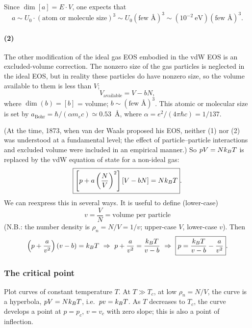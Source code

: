 Since $\dim[a] = E\cdot V$, one expects that
\begin{equation}
  a\sim U_0\cdot(\text{atom or molecule size})^3\sim U_0(\text{few \AA})^3\sim(10^{-2}\ \text{eV})(\text{few \AA})^3 .
\end{equation}

\paragraph{(2)} The other modification of the ideal gas EOS embodied in the vdW EOS is an excluded-volume
correction. The nonzero size of the gas particles is neglected in the ideal EOS, but in reality these particles
do have nonzero size, so the volume available to them is less than $V$;
\begin{equation}
  V_{\text{available}} = V - bN,
\end{equation}
where $\dim(b) = [b]$ = volume; $b\sim(\text{few \AA})^3$. This atomic or molecular size is set by
$a_{\text{Bohr}} = \hbar/(\alpha m_ec)\simeq 0.53$~\AA, where $\alpha = e^2/(4\pi\hbar c) = 1/137$.

(At the time, 1873, when van der Waals proposed his EOS, neither (1) nor (2) was understood at a fundamental
level; the effect of particle--particle interactions and excluded volume were included in an empirical manner.)
So $pV = Nk_{B} T$ is replaced by the vdW equation of state for a non-ideal gas:
\begin{equation}
  \boxed{\left[p + a\left(\frac{N}{V}\right)^2\right]\left[V - bN\right] = Nk_{B} T}.
\end{equation}
We can reexpress this in several ways. It is useful to define (lower-case)
\begin{equation}
  v = \frac{V}{N} = \text{volume per particle}
\end{equation}
(N.B.: the number density is $\rho_n = N/V = 1/v$; upper-case $V$, lower-case $v$). Then
\begin{equation}
  \left(p + \frac{a}{v^2}\right)(v-b) = k_{B} T\ \Rightarrow\ p + \frac{a}{v^2} = \frac{k_{B} T}{v-b}
  \ \Rightarrow\ \boxed{p = \frac{k_{B} T}{v-b} - \frac{a}{v^2}}.
\end{equation}

\subsubsection*{The critical point}

Plot curves of constant temperature $T$. At $T\gg T_c$, at low $\rho_n = N/V$, the curve is a hyperbola,
$pV = Nk_{B} T$, i.e.\ $pv = k_{B} T$. As $T$ decreases to $T_c$, the curve develops a point at $p = p_c$, $v = v_c$
with zero slope; this is also a point of inflection.

